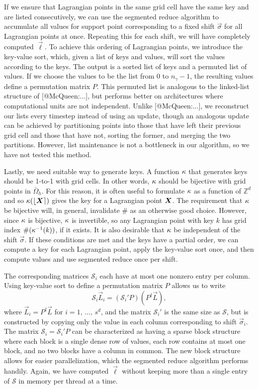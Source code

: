 If we ensure that Lagrangian points in the same grid cell have the same key
and are listed consecutively, we can use the segmented reduce algorithm to
accumulate all values for support point corresponding to a fixed shift
$\vec{\sigma}$ for all Lagrangian points at once. Repeating this for each
shift, we will have completely computed $\vec{\ell}$. To achieve this ordering
of Lagrangian points, we introduce the key-value sort, which, given a list
of keys and values, will sort the values according to the keys. The output is
a sorted list of keys and a permuted list of values. If we choose the values to
be the list from 0 to $n_\gamma-1$, the resulting values define a permutation
matrix $P$. This permuted list is analogous to the linked-list structure of
[@McQueen:...], but performs better on architectures where computational units
are not independent. Unlike [@McQueen:...], we reconstruct our lists every
timestep instead of using an update, though an analogous update can be achieved
by partitioning points into those that have left their previous grid cell
and those that have not, sorting the former, and merging the two partitions.
However, list maintenance is not a bottleneck in our algorithm, so we have not
tested this method.

Lastly, we need suitable way to generate keys. A function $\kappa$ that
generates keys should be 1-to-1 with grid cells. In other words, $\kappa$
should be bijective with grid points in $\bar{\Omega}_h$. For this reason, it
is often useful to formulate $\kappa$ as a function of $\mathbb{Z}^d$ and
so $\kappa(\left\lfloor{\boldsymbol{X}}\right\rceil)$ gives the key for a Lagrangian point $\boldsymbol{X}$. The
requirement that $\kappa$ be bijective will, in general, invalidate $\#$
as an otherwise good choice. However, since $\kappa$ is bijective,
$\kappa$ is invertible, so any Lagrangian point with key $k$ has grid
index $\#(\kappa^{-1}(k))$, if it exists. It is also desirable that
$\kappa$ be independent of the shift $\vec{\sigma}$. If these conditions
are met and the keys have a partial order, we can compute a key for each
Lagrangian point, apply the key-value sort once, and then compute values and
use segmented reduce once per shift.

The corresponding matrices $\mathcal{S}_i$ each have at most one nonzero entry
per column. Using key-value sort to define a permutation matrix $P$ allows us
to write
\begin{equation}
    \label{eq:submatrix}
    \mathcal{S}_i\vec{L}_i = (\mathcal{S}_i'P)(P^\dagger\vec{L}),
\end{equation}
where $\vec{L}_i=P^\dagger\vec{L}$ for $i=1,\,\ldots,\,s^d$, and the matrix
$\mathcal{S}_i'$ is the same size as $\mathcal{S}$, but is constructed by
copying only the value in each column corresponding to shift $\vec{\sigma}_i$.
The matrix $\mathcal{S}_i=\mathcal{S}_i'P$ can be characterized as having
a sparse block structure where each block is a single dense row of values, each
row contains at most one block, and no two blocks have a column in common. The
new block structure allows for easier parallelization, which the segmented
reduce algorithm performs handily. Again, we have computed $\vec{\ell}$ without
keeping more than a single entry of $\mathcal{S}$ in memory per thread at a
time.

